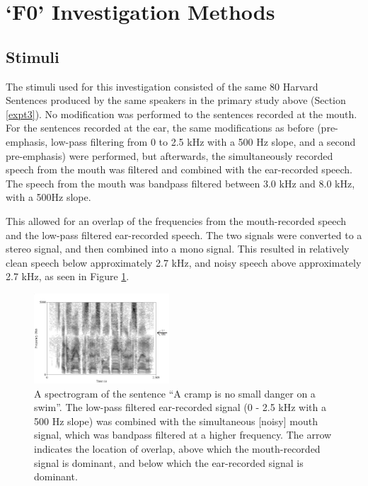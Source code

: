 

\section{`F0' Investigation Methods}
\label{F0-methods}

\subsection{Stimuli}\label{F0-stimuli}

The stimuli used for this investigation consisted of the same 80 Harvard Sentences produced by the same speakers in the primary study above (Section \ref{expt3}).
No modification was performed to the sentences recorded at the mouth.  For the sentences recorded at the ear, the same modifications as before (pre-emphasis, low-pass filtering from 0 to 2.5 kHz with a 500 Hz slope, and a second pre-emphasis) were performed, but afterwards, the simultaneously recorded speech from the mouth was filtered and combined with the ear-recorded speech.  The speech from the mouth was bandpass filtered between 3.0 kHz and 8.0 kHz, with a 500Hz slope.  

This allowed for an overlap of the frequencies from the mouth-recorded speech and the low-pass filtered ear-recorded speech.  The two signals were converted to a stereo signal, and then combined into a mono signal.  This resulted in relatively clean speech below approximately 2.7 kHz, and noisy speech above approximately 2.7 kHz, as seen in Figure \ref{fig:combined-signal}.
%
\begin{figure}
\centering
  \includegraphics[width=0.45\textwidth]{figure/combined-signal_labeled.png}
  \caption{A spectrogram of the sentence ``A cramp is no small danger on a swim''.  The low-pass filtered ear-recorded signal (0 - 2.5 kHz with a 500 Hz slope) was combined with the simultaneous [noisy] mouth signal, which was bandpass filtered at a higher frequency.  The arrow indicates the location of overlap, above which the mouth-recorded signal is dominant, and below which the ear-recorded signal is dominant.}
  \label{fig:combined-signal}
\end{figure}
%

